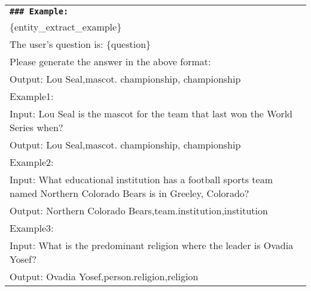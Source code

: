 \begin{table*}[h]
\begin{tabular}{p{15cm}}
        \vspace{2mm}  
        \textbf{\texttt{\#\#\# Example:}} \\
        \{entity\_extract\_example\} \\
        The user's question is: \{question\} \\
        Please generate the answer in the above format: \\
        Output: Lou Seal,mascot. championship, championship \\
        
        \vspace{2mm}  
        Example1: \\
        Input: Lou Seal is the mascot for the team that last won the World Series when? \\
        Output: Lou Seal,mascot. championship, championship \\
        
        \vspace{2mm} 
        Example2: \\
        Input: What educational institution has a football sports team named Northern Colorado Bears is in Greeley, Colorado? \\
        Output: Northern Colorado Bears,team.institution,institution \\
        
        \vspace{2mm} 
        Example3: \\
        Input: What is the predominant religion where the leader is Ovadia Yosef? \\
        Output: Ovadia Yosef,person.religion,religion \\
       
        \bottomrule
    \end{tabular}
\end{table*}

         
        

